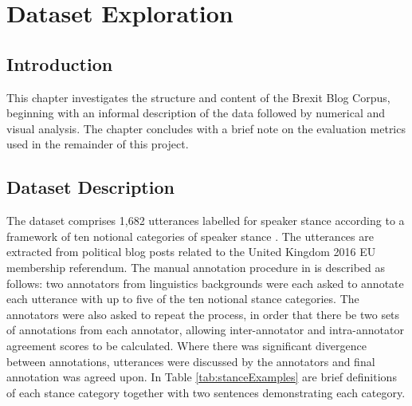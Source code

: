 \documentclass[Dissertation.tex]{subfiles}
\begin{document}
\chapter{Dataset Exploration}\label{sec:dataEx}
\section{Introduction}
This chapter investigates the structure and content of the Brexit Blog Corpus, beginning with an informal description of the data followed by numerical and visual analysis. The chapter concludes with a brief note on the evaluation metrics used in the remainder of this project. 
\section{Dataset Description} \label{Data}

The dataset comprises 1,682 utterances  labelled for speaker stance according to a framework of ten notional categories of speaker stance \cite{simakiAnnotatingSpeakerStance2017}. The utterances are extracted from political blog posts related to the United Kingdom 2016 EU membership referendum. The manual annotation procedure in \cite{simakiAnnotatingSpeakerStance2017} is described as follows: two annotators from linguistics backgrounds were each asked to annotate each utterance with up to five of the ten notional stance categories. The annotators were also asked to repeat the process, in order that there be two sets of annotations from each annotator, allowing inter-annotator and intra-annotator agreement scores to be calculated. Where there was significant divergence between annotations, utterances were discussed by the annotators and final annotation was agreed upon. In Table \ref{tab:stanceExamples} are brief definitions of each stance category together with two sentences demonstrating each category.
\end{document}
